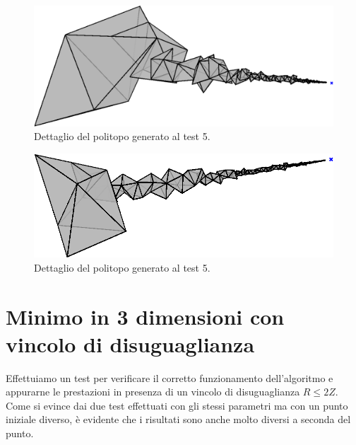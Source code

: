 \documentclass[a4paper, 11pt]{article}
\begin{document}
\begin{figure}[H]
	\centering
		\includegraphics[width=14cm]{assets/figure5}
		\caption{Dettaglio del politopo generato al test 5.}
\end{figure}
\noindent 

\begin{figure}[H]
	\centering
		\includegraphics[width=14cm]{assets/figure6}
		\caption{Dettaglio del politopo generato al test 5.}
\end{figure}
\noindent

\newpage
\section{Minimo in 3 dimensioni con vincolo di disuguaglianza}

Effettuiamo un test per verificare il corretto funzionamento dell'algoritmo e
appurarne le prestazioni in presenza di un vincolo di disuguaglianza $R \le 2Z$. Come si evince
dai due test effettuati con gli stessi parametri ma con un punto iniziale
diverso, è evidente che i risultati sono anche molto diversi a seconda del punto.
\end{document}
